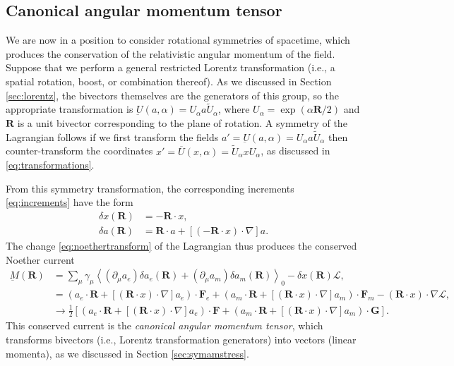 \documentclass[1p,sort&compress]{elsarticle}
\numberwithin{equation}{section}
\newcommand{\bv}[1]{\mathbf{#1}}
\newcommand{\smean}[1]{\left\langle #1 \right\rangle}
\begin{document}

\subsection{Canonical angular momentum tensor}\label{sec:canonicalAM}


We are now in a position to consider rotational symmetries of spacetime, which produces the conservation of the relativistic angular momentum of the field. Suppose that we perform a general restricted Lorentz transformation (i.e., a spatial rotation, boost, or combination thereof).  As we discussed in Section \ref{sec:lorentz}, the bivectors themselves are the generators of this group, so the appropriate transformation is $\underbar{U}(a,\alpha) = U_\alpha a \widetilde{U}_\alpha$, where $U_\alpha = \exp(\alpha \bv{R}/2)$ and $\bv{R}$ is a unit bivector corresponding to the plane of rotation.  A symmetry of the Lagrangian follows if we first transform the fields $a' = \underbar{U}(a,\alpha) = U_\alpha a \tilde{U}_\alpha$ then counter-transform the coordinates $x' = \overline{U}(x,\alpha) = \tilde{U}_\alpha x U_\alpha$, as discussed in \eqref{eq:transformations}.

From this symmetry transformation, the corresponding increments \eqref{eq:increments} have the form
\begin{subequations}
\begin{align}
  \delta x(\bv{R}) &= -\bv{R}\cdot x, \\
  \delta a(\bv{R}) &= \bv{R}\cdot a + [(-\bv{R}\cdot x)\cdot\nabla]a. 
\end{align}
\end{subequations}
The change \eqref{eq:noethertransform} of the Lagrangian thus produces the conserved Noether current
\begin{align}\label{eq:angmomtensgen}
  \underbar{M}(\bv{R}) &= \sum_\mu\gamma_\mu\smean{(\partial_\mu a_e)\delta a_e(\bv{R}) + (\partial_\mu a_m)\delta a_m(\bv{R})}_0 - \delta x(\bv{R})\mathcal{L}, \\
  &= \left(a_e\cdot \bv{R} + [(\bv{R}\cdot x)\cdot\nabla]a_e\right)\cdot\bv{F}_e + \left(a_m\cdot \bv{R} + [(\bv{R}\cdot x)\cdot\nabla]a_m\right)\cdot\bv{F}_m  - (\bv{R}\cdot x)\cdot\nabla\mathcal{L}, \nonumber \\
  &\to \frac{1}{2}\left[(a_e\cdot \bv{R} + [(\bv{R}\cdot x)\cdot\nabla]a_e)\cdot\bv{F} + (a_m\cdot \bv{R} + [(\bv{R}\cdot x)\cdot\nabla]a_m)\cdot \bv{G}\right]. \nonumber
\end{align}
This conserved current is the \emph{canonical angular momentum tensor}, which transforms bivectors (i.e., Lorentz transformation generators) into vectors (linear momenta), as we discussed in Section \ref{sec:symamstress}.
\end{document}
